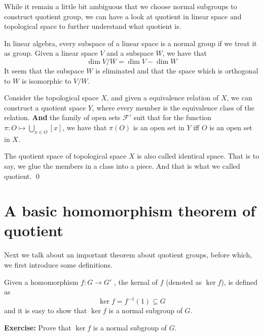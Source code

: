 \documentclass[../main.tex]{subfiles}
\begin{document}
\begin{exam}
While it remain a little bit ambiguous that we choose normal subgroups to construct 
quotient group, we can have a look at quotient in linear space and topological space 
to further understand what quotient is.

In linear algebra, every subspace of a linear space is a normal group if we treat it as group. 
Given a linear space \(V\) and a subspace \(W\), we have that 
\[
\dim V / W = \dim V - \dim W
\]
It seem that the subspace \(W\) is eliminated and that the space which is orthogonal to \(W\) is isomorphic to 
\(V / W\). 

Consider the topological space \(X\), and given a equivalence relation of \(X\), we can construct a quotient space 
	\(Y\), where every member is the equivalence class of the relation. \textbf{And} the family of open sets \(\mathscr F'\) suit that for the function \(\pi \colon O \mapsto \bigcup_{ x \in O} [x]\), 
	we have that \(\pi (O)\) is an open set in \(Y\) iff \(O\) is an open set in \(X\). 

	The quotient space of topological space \(X\) is also called identical space. That is to say, we glue the 
	members in a class into a piece. And that is what we called quotient.  \qed
\end{exam}

\section{A basic homomorphism theorem of quotient}
\label{sec:A basic homomorphism theorem of quotient}
Next we talk about an important theorem about quotient groups, before which, we first introduce some 
definitions.
\begin{definition}[kernal]\label{def:kernal}
	Given a homomorphism \(f \colon G \to G '\) , the kernal of \(f\) (denoted as \(\ker f\)), is defined as 
	\[
		\ker f = f ^{-1} (1) \subseteq G
	\]
	and it is easy to show that \(\ker f\) is a normal subgroup of \(G\).
\end{definition}
\noindent \textbf{Exercise:} Prove that \(\ker f\) is a normal subgroup of \(G\).
\medskip
\end{document}
